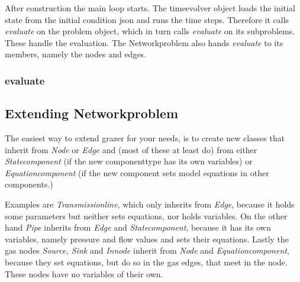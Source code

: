 \documentclass[a4paper]{article}
\begin{document}
After construction the main loop starts.
The timeevolver object loads the initial state from the initial condition json and runs the time steps.
Therefore it calls \emph{evaluate} on the problem object, which in turn calls \emph{evaluate} on its subproblems.
These handle the evaluation. The Networkproblem also hands \emph{evaluate} to its members, namely the nodes and edges.

\subsubsection*{evaluate}

\subsection{Extending Networkproblem}
\label{sec:extend-netw}
The easiest way to extend grazer for your needs, is to create new classes that inherit from \emph{Node} or \emph{Edge} and
(most of these at least do) from either \emph{Statecomponent} (if the new componenttype has its own variables) or
\emph{Equationcomponent} (if the new component sets model equations in other components.)

Examples are \emph{Transmissionline}, which only inherits from \emph{Edge}, because it holds some parameters but neither sets equations, nor holds variables.
On the other hand \emph{Pipe} inherits from \emph{Edge} and \emph{Statecomponent}, because it has its own variables, namely pressure and flow values and sets their equations.
Lastly the gas nodes \emph{Source, Sink} and \emph{Innode} inherit from \emph{Node} and \emph{Equationcomponent}, because they set equations, but do so in the gas edges, that meet in the node. These nodes have no variables of their own.
\end{document}
